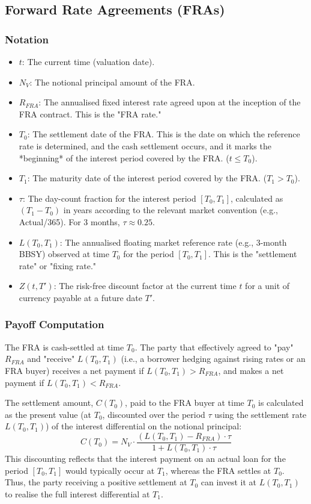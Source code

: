 \documentclass[11pt, a4paper, british]{article}
\begin{document}
\subsection{Forward Rate Agreements (FRAs)}

\subsubsection{Notation}
\begin{itemize}
 \item $t$: The current time (valuation date).
 \item $N_V$: The notional principal amount of the FRA.
 \item $R_{FRA}$: The annualised fixed interest rate agreed upon at the inception of the FRA contract. This is the "FRA rate."
 \item $T_0$: The settlement date of the FRA. This is the date on which the reference rate is determined, and the cash settlement occurs, and it marks the *beginning* of the interest period covered by the FRA. ($t \le T_0$).
 \item $T_1$: The maturity date of the interest period covered by the FRA. ($T_1 > T_0$).
 \item $\tau$: The day-count fraction for the interest period $[T_0, T_1]$, calculated as $(T_1 - T_0)$ in years according to the relevant market convention (e.g., Actual/365). For 3 months, $\tau \approx 0.25$.
 \item $L(T_0, T_1)$: The annualised floating market reference rate (e.g., 3-month BBSY) observed at time $T_0$ for the period $[T_0, T_1]$. This is the "settlement rate" or "fixing rate."
 \item $Z(t, T')$: The risk-free discount factor at the current time $t$ for a unit of currency payable at a future date $T'$.
\end{itemize}

\subsubsection{Payoff Computation}

The FRA is cash-settled at time $T_0$. The party that effectively agreed to "pay" $R_{FRA}$ and "receive" $L(T_0, T_1)$ (i.e., a borrower hedging against rising rates or an FRA buyer) receives a net payment if $L(T_0, T_1) > R_{FRA}$, and makes a net payment if $L(T_0, T_1) < R_{FRA}$.

The settlement amount, $C(T_0)$, paid to the FRA buyer at time $T_0$ is calculated as the present value (at $T_0$, discounted over the period $\tau$ using the settlement rate $L(T_0, T_1)$) of the interest differential on the notional principal:
\begin{equation}
 C(T_0) = N_V \cdot \frac{(L(T_0, T_1) - R_{FRA}) \cdot \tau}{1 + L(T_0, T_1) \cdot \tau}
 \label{eq:FRASettlement_rigorous}
\end{equation}
This discounting reflects that the interest payment on an actual loan for the period $[T_0, T_1]$ would typically occur at $T_1$, whereas the FRA settles at $T_0$. Thus, the party receiving a positive settlement at $T_0$ can invest it at $L(T_0, T_1)$ to realise the full interest differential at $T_1$.
\end{document}
